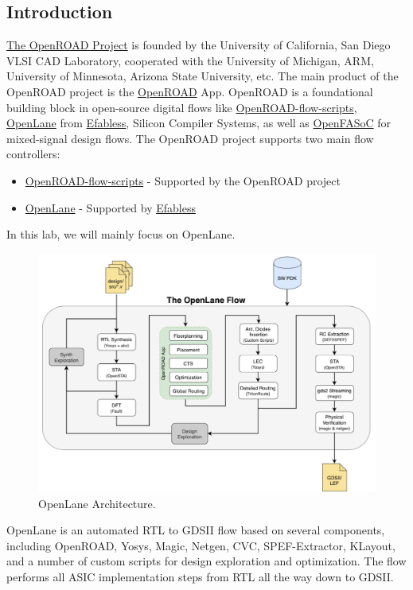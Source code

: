 \documentclass[a4paper,12pt,twoside]{article}
\begin{document}
\subsection{Introduction}
\href{https://theopenroadproject.org/}{The OpenROAD Project} is founded by the University of California, San Diego VLSI CAD Laboratory, cooperated with the University of Michigan, ARM, University of Minnesota, Arizona State University, etc. The main product of the OpenROAD project is the \href{https://github.com/The-OpenROAD-Project/OpenROAD}{OpenROAD} App. OpenROAD is a foundational building block in open-source digital flows like \href{https://github.com/The-OpenROAD-Project/OpenROAD-flow-scripts}{OpenROAD-flow-scripts}, \href{https://github.com/The-OpenROAD-Project/OpenLane}{OpenLane} from \href{https://efabless.com/}{Efabless}, Silicon Compiler Systems, as well as \href{https://github.com/idea-fasoc/OpenFASOC}{OpenFASoC} for mixed-signal design flows. The OpenROAD project supports two main flow controllers:
\begin{itemize}
    \item \href{https://github.com/The-OpenROAD-Project/OpenROAD-flow-scripts}{OpenROAD-flow-scripts} - Supported by the OpenROAD project
    \item \href{https://github.com/The-OpenROAD-Project/OpenLane}{OpenLane} - Supported by \href{https://efabless.com/}{Efabless}
\end{itemize}
In this lab, we will mainly focus on OpenLane.
\begin{figure}[H]
    \centering
    \includegraphics[width=\textwidth]{images/33.png}
    \caption{OpenLane Architecture.}
    \label{f33}
\end{figure}
OpenLane is an automated RTL to GDSII flow based on several components, including OpenROAD, Yosys, Magic, Netgen, CVC, SPEF-Extractor, KLayout, and a number of custom scripts for design exploration and optimization. The flow performs all ASIC implementation steps from RTL all the way down to GDSII.
\end{document}
